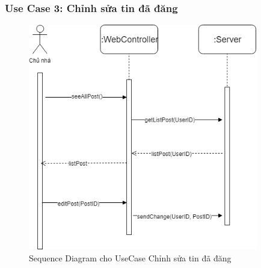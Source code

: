 \subsubsection{Use Case 3: Chỉnh sửa tin đã đăng}
\begin{figure}[!h]
	\centering
	\includegraphics[width=10cm]{parts/bao/images/SequenceDiagram_EditPost.png}
	\caption{Sequence Diagram cho UseCase Chỉnh sửa tin đã đăng}
\end{figure}
